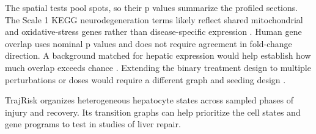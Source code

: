 The spatial tests pool spots, so their p values summarize the profiled sections. The Scale 1 KEGG neurodegeneration terms likely reflect shared mitochondrial and oxidative-stress genes rather than disease-specific expression \cite{ref103,ref104}. Human gene overlap uses nominal p values and does not require agreement in fold-change direction. A background matched for hepatic expression would help establish how much overlap exceeds chance \cite{ref105,ref106}. Extending the binary treatment design to multiple perturbations or doses would require a different graph and seeding design \cite{ref107,ref108}.

TrajRisk organizes heterogeneous hepatocyte states across sampled phases of injury and recovery. Its transition graphs can help prioritize the cell states and gene programs to test in studies of liver repair.
